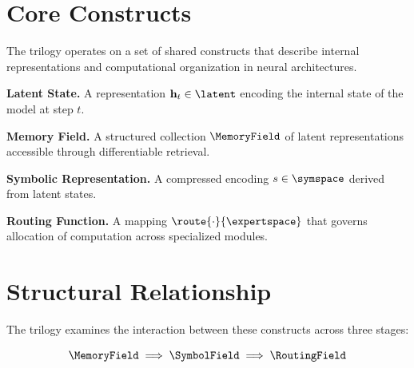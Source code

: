 

\section*{Core Constructs}

The trilogy operates on a set of shared constructs that describe internal representations and computational organization in neural architectures.

\textbf{Latent State.}
A representation $\mathbf{h}_t \in \latent$ encoding the internal state of the model at step $t$.

\textbf{Memory Field.}
A structured collection $\MemoryField$ of latent representations accessible through differentiable retrieval.

\textbf{Symbolic Representation.}
A compressed encoding $s \in \symspace$ derived from latent states.

\textbf{Routing Function.}
A mapping $\route{\cdot}{\expertspace}$ that governs allocation of computation across specialized modules.

\section*{Structural Relationship}

The trilogy examines the interaction between these constructs across three stages:

\[
\MemoryField \;\Longrightarrow\; \SymbolField \;\Longrightarrow\; \RoutingField
\]